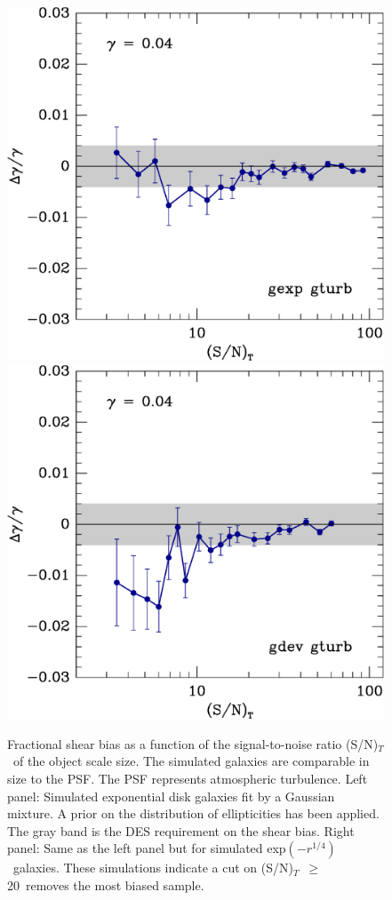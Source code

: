 \documentclass[12pt]{article}
\newcommand{\devprof}{exp$(-r^{1/4})$}
\newcommand{\sncut}{20}
\newcommand{\snsize}{(S/N)$_{T}$}
\begin{document}
\begin{figure}[t]
\centering

\includegraphics[scale=0.4]{mcbayes-get03r01r02r03r04r05-yr-0.030-0.030-frac.eps}
\includegraphics[scale=0.4]{mcbayes-gdt03r01r02r03r04-yr-0.030-0.030-frac.eps}

\caption{Fractional shear bias as a function of the signal-to-noise ratio
    \snsize\ of the object scale size.  The simulated galaxies are comparable
    in size to the PSF.  The PSF represents atmospheric turbulence.  Left
    panel: Simulated exponential disk galaxies fit by a Gaussian mixture.  A
    prior on the distribution of ellipticities has been applied.  The gray band
    is the DES requirement on the shear bias. Right panel: Same as the left
    panel but for simulated \devprof\ galaxies.  These simulations indicate a
    cut on \snsize\ $\geq$ \sncut\ removes the most biased sample.
\label{fig:getgdt} }

\end{figure}
\end{document}
